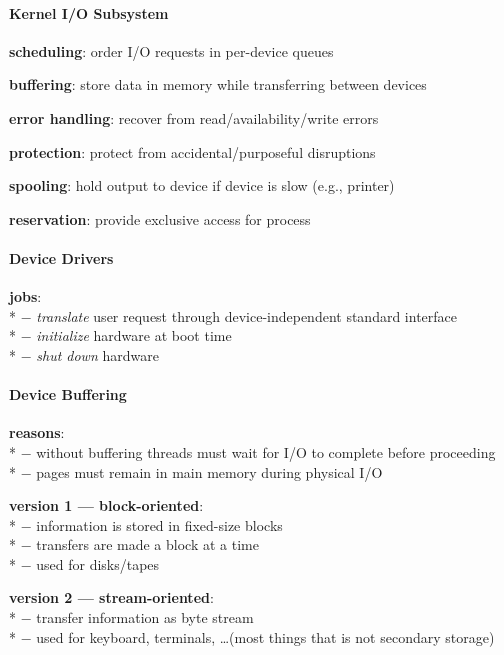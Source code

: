 \paragraph{Kernel I/O Subsystem}
\begin{items}
  \item \textbf{scheduling}: order I/O requests in per-device queues
  \item \textbf{buffering}: store data in memory while transferring between devices
  \item \textbf{error handling}: recover from read/availability/write errors
  \item \textbf{protection}: protect from accidental/purposeful disruptions
  \item \textbf{spooling}: hold output to device if device is slow (e.g., printer)
  \item \textbf{reservation}: provide exclusive access for process
\end{items}

\paragraph{Device Drivers}
\begin{items}
  \item \textbf{jobs}: \\*
    $ - $ \emph{translate} user request through device-independent standard interface \\*
    $ - $ \emph{initialize} hardware at boot time \\*
    $ - $ \emph{shut down} hardware
\end{items}

\paragraph{Device Buffering}
\begin{items}
  \item \textbf{reasons}: \\*
    $ - $ without buffering threads must wait for I/O to complete before proceeding \\*
    $ - $ pages must remain in main memory during physical I/O
  \item \textbf{version 1 --- block-oriented}: \\*
    $ - $ information is stored in fixed-size blocks \\*
    $ - $ transfers are made a block at a time \\*
    $ - $ used for disks/tapes
  \item \textbf{version 2 --- stream-oriented}: \\*
    $ - $ transfer information as byte stream \\*
    $ - $ used for keyboard, terminals, \dots (most things that is not secondary storage)
\end{items}

